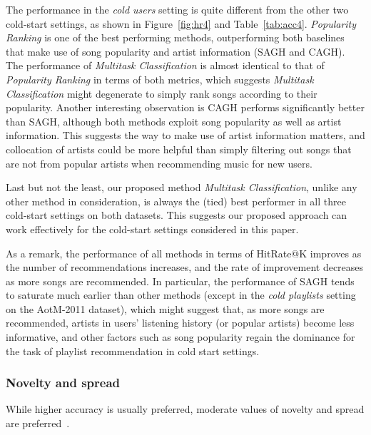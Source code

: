 The performance in the \emph{cold users} setting %
is quite different from the other two cold-start settings, as shown in Figure~\ref{fig:hr4} and Table~\ref{tab:acc4}.
{\it Popularity Ranking} is one of the best performing methods,
outperforming both baselines that make use of song popularity and artist information (\ie SAGH and CAGH).
The performance of {\it Multitask Classification} is almost identical to that of {\it Popularity Ranking} in terms of both metrics,
which suggests {\it Multitask Classification} might degenerate to simply rank songs according to their popularity.
Another interesting observation is CAGH performs significantly better than SAGH,
although both methods exploit song popularity as well as artist information.
This suggests the way to make use of artist information matters,
and collocation of artists could be more helpful than simply filtering out songs that are not from popular artists
when recommending music for new users.

Last but not the least, our proposed method {\it Multitask Classification}, unlike any other method in consideration,
is always the (tied) best performer in all three cold-start settings on both datasets.
This suggests our proposed approach can work effectively for the cold-start settings considered in this paper.

As a remark, the performance of all methods in terms of HitRate@K improves as the number of recommendations increases,
and the rate of improvement decreases as more songs are recommended.
In particular, the performance of SAGH tends to saturate much earlier than other methods 
(except in the \emph{cold playlists} setting on the AotM-2011 dataset),
which might suggest that, as more songs are recommended, artists in users' listening history (or popular artists) become less informative,
and other factors such as song popularity regain the dominance for the task of playlist recommendation in cold start settings.


\subsubsection{Novelty and spread}

While higher accuracy is usually preferred, 
moderate values of novelty and spread are preferred~\cite{kluver2014evaluating,schedl2017}.




